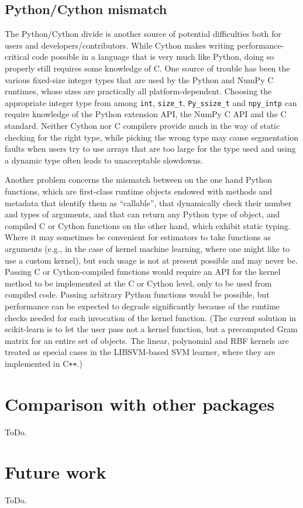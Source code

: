 \documentclass[a4paper]{article}
\DeclareRobustCommand{\VAN}[3]{#2}
\begin{document}
\subsection{Python/Cython mismatch}

The Python/Cython divide is another source of potential difficulties
both for users and developers/contributors.
While Cython makes writing performance-critical code possible
in a language that is very much like Python,
doing so properly still requires some knowledge of C.
One source of trouble has been the various fixed-size integer types
that are used by the Python and NumPy C runtimes,
whose sizes are practically all platform-dependent.
Choosing the appropriate integer type from among
\texttt{int}, \texttt{size\_t}, \texttt{Py\_ssize\_t} and \texttt{npy\_intp}
can require knowledge of the Python extension API,
the NumPy C API and the C standard.
Neither Cython nor C compilers provide much in the way of static checking
for the right type,
while picking the wrong type may cause segmentation faults
when users try to use arrays that are too large for the type used
and using a dynamic type often leads to unacceptable slowdowns.

Another problem concerns the mismatch between on the one hand Python functions,
which are first-class runtime objects endowed with methods and metadata
that identify them as ``callable'',
that dynamically check their number and types of arguments,
and that can return any Python type of object,
and compiled C or Cython functions on the other hand,
which exhibit static typing.
Where it may sometimes be convenient for estimators
to take functions as arguments
(e.g., in the case of kernel machine learning,
where one might like to use a custom kernel),
but such usage is not at present possible and may never be.
Passing C or Cython-compiled functions would require an API for the kernel method
to be implemented at the C or Cython level,
only to be used from compiled code.
Passing arbitrary Python functions would be possible,
but performance can be expected to degrade significantly
because of the runtime checks needed for each invocation of the kernel function.
(The current solution in scikit-learn is to let the user pass not a kernel function,
but a precomputed Gram matrix for an entire set of objects.
The linear, polynomial and RBF kernels are treated as special cases in
the \textsf{LIBSVM}-based SVM learner, where they are implemented in C{}\verb!++!.)

\section{Comparison with other packages}

ToDo.

\section{Future work}

ToDo.


\DeclareRobustCommand{\VAN}[3]{#3}

\end{document}
